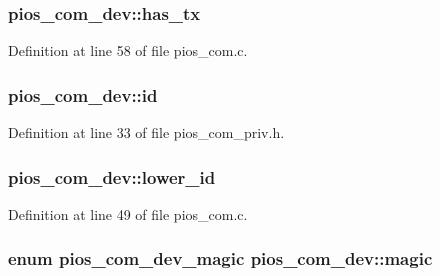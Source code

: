 \hypertarget{structpios__com__dev_af723f3ee893a43d4ba3fff3e8ff6d3f7}{
\subsubsection[{has\-\_\-tx}]{ pios\-\_\-com\-\_\-dev\-::has\-\_\-tx}}\label{structpios__com__dev_af723f3ee893a43d4ba3fff3e8ff6d3f7}


Definition at line 58 of file pios\-\_\-com.\-c.

\hypertarget{structpios__com__dev_ad606472009d6e09d97b9ad621d12a643}{
\subsubsection[{id}]{ pios\-\_\-com\-\_\-dev\-::id}}\label{structpios__com__dev_ad606472009d6e09d97b9ad621d12a643}


Definition at line 33 of file pios\-\_\-com\-\_\-priv.\-h.

\hypertarget{structpios__com__dev_a3447468fdb0c7996c3669046d48b4cb6}{
\subsubsection[{lower\-\_\-id}]{ pios\-\_\-com\-\_\-dev\-::lower\-\_\-id}}\label{structpios__com__dev_a3447468fdb0c7996c3669046d48b4cb6}


Definition at line 49 of file pios\-\_\-com.\-c.

\hypertarget{structpios__com__dev_ac886360255eb683d1be8e60bde922e69}{
\subsubsection[{magic}]{\setlength{\rightskip}{0pt plus 5cm}enum {\bf pios\-\_\-com\-\_\-dev\-\_\-magic} pios\-\_\-com\-\_\-dev\-::magic}}\label{structpios__com__dev_ac886360255eb683d1be8e60bde922e69}


